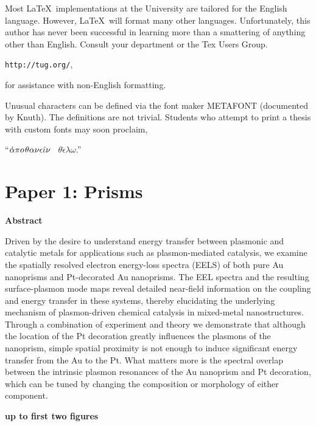 \documentclass [11pt, proquest] {uwthesis}[2016/11/22]
\let\mffont=\sf
\begin{document}
Most \LaTeX\ implementations at the University are tailored
for the English language.  However, \LaTeX\ will format many
other languages.  Unfortunately, this author has never been successful in 
learning more than a smattering of anything other than English.
Consult your department or the Tex Users Group.
\smallskip
\begin{center}
{\tt http://tug.org/},
\end{center}
\smallskip
for assistance with non-English formatting.

Unusual characters can be defined via the
font maker \hbox{\mffont METAFONT} (documented by Knuth\cite{Metafont}).
The definitions are not trivial.
Students who attempt to print a thesis with
custom fonts may soon proclaim,
 
\medskip
\begin{center}
``$\mathaccent"7027\alpha\pi o\kern1pt\theta\alpha\nu\epsilon\hat\iota\nu$
\ $\theta\acute\epsilon\lambda\omega$.''
 
\end{center}
 
 
\chapter{Paper 1: Prisms}
 
{\bf Abstract}

Driven by the desire to understand energy transfer between plasmonic and catalytic metals for applications such as plasmon-mediated catalysis, we examine the spatially resolved electron energy-loss spectra (EELS) of both pure Au nanoprisms and Pt-decorated Au nanoprisms. The EEL spectra and the resulting surface-plasmon mode maps reveal detailed near-field information on the coupling and energy transfer in these systems, thereby elucidating the underlying mechanism of plasmon-driven chemical catalysis in mixed-metal nanostructures. Through a combination of experiment and theory we demonstrate that although the location of the Pt decoration greatly influences the plasmons of the nanoprism, simple spatial proximity is not enough to induce significant energy transfer from the Au to the Pt. What matters more is the spectral overlap between the intrinsic plasmon resonances of the Au nanoprism and Pt decoration, which can be tuned by changing the composition or morphology of either component.

{\bf up to first two figures}
\end{document}
